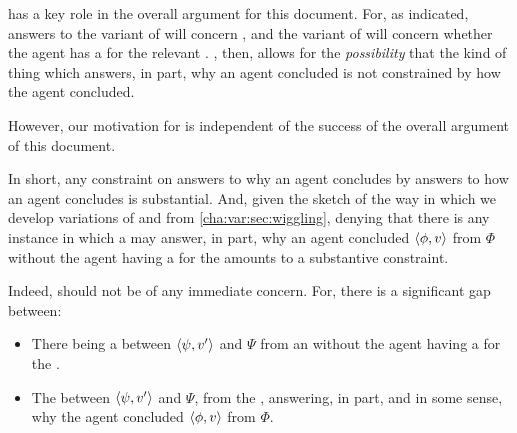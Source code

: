 \begin{note}
  \supportII{} has a key role in the overall argument for this document.
  For, as indicated, answers to the variant of \qWhy{} will concern \ros{}, and the variant of \qHow{} will concern whether the agent has a \wit{} for the relevant \ros{}.
  \supportII{}, then, allows for the \emph{possibility} that the kind of thing which answers, in part, why an agent concluded is not constrained by how the agent concluded.

  However, our motivation for \supportII{} is independent of the success of the overall argument of this document.

  In short, any constraint on answers to why an agent concludes by answers to how an agent concludes is substantial.
  And, given the sketch of the way in which we develop variations of \qWhy{} and \qHow{} from \autoref{cha:var:sec:wiggling}, denying that there is any instance in which a \ros{} may answer, in part, why an agent concluded \(\langle \phi, v \rangle\) from \(\Phi\) without the agent having a \wit{} for the \ros{} amounts to a substantive constraint.

  Indeed, \supportII{} should not be of any immediate concern.
  For, there is a significant gap between:

  \begin{itemize}[noitemsep]
  \item
    There being a \ros{} between \(\langle \psi, v' \rangle\) and \(\Psi\) from an \agpe{} without the agent having a \wit{} for the \ros{}.
  \item
    The \ros{} between \(\langle \psi, v' \rangle\) and \(\Psi\), from the \agpe{}, answering, in part, and in some sense, why the agent concluded \(\langle \phi, v \rangle\) from \(\Phi\).
  \end{itemize}
\end{note}





